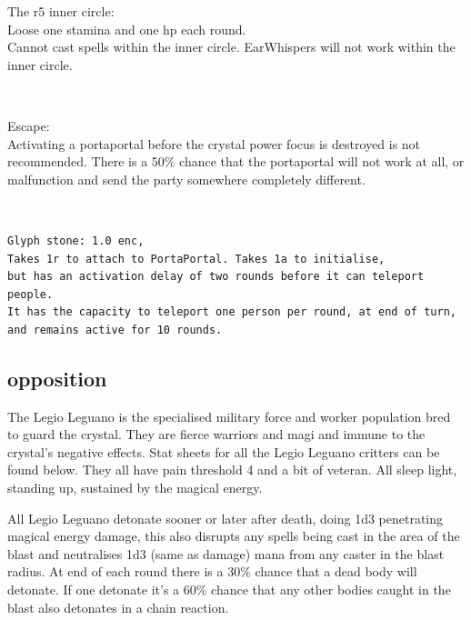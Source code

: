 The r5 inner circle:\\
Loose one stamina and one hp each round.\\
Cannot cast spells within the inner circle.
EarWhispers will not work within the inner circle.

\

Escape:\\
Activating a portaportal before the crystal power focus is destroyed is not recommended. There is a 50\% chance that the portaportal will not work at all, or malfunction and send the party somewhere completely different.

\

\begin{samepage}
\small \begin{verbatim}
Glyph stone: 1.0 enc,
Takes 1r to attach to PortaPortal. Takes 1a to initialise,
but has an activation delay of two rounds before it can teleport people.
It has the capacity to teleport one person per round, at end of turn,
and remains active for 10 rounds.
\end{verbatim} \normalsize
\end{samepage}






\subsection*{opposition}
The Legio Leguano is the specialised military force and worker population bred to guard the crystal. They are fierce warriors and magi and immune to the crystal's negative effects. Stat sheets for all the Legio Leguano critters can be found below. They all have pain threshold 4 and a bit of veteran. All sleep light, standing up, sustained by the magical energy.

All Legio Leguano detonate sooner or later after death, doing 1d3 penetrating magical energy damage, this also disrupts any spells being cast in the area of the blast and neutralises 1d3 (same as damage) mana from any caster in the blast radius. At end of each round there is a 30\% chance that a dead body will detonate. If one detonate it's a 60\% chance that any other bodies caught in the blast also detonates in a chain reaction.


